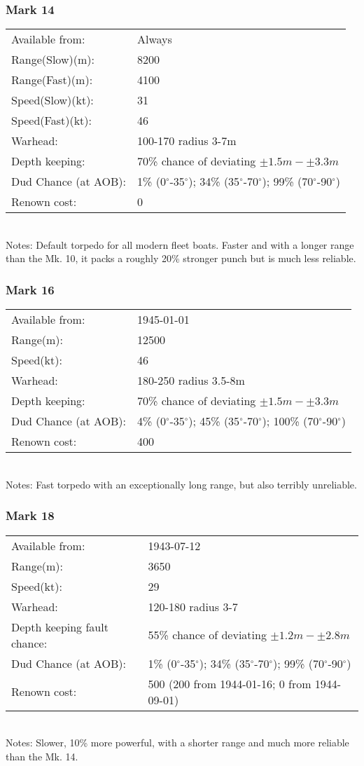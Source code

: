 \documentclass{article}
\newcommand{\degree}{$^{\circ}$}
\begin{document}
\subsubsection{Mark 14}
\begin{tabular}{l|l}
Available from:& Always\\
Range(Slow)(m):& 8200\\
Range(Fast)(m):& 4100\\
Speed(Slow)(kt):&31\\
Speed(Fast)(kt):& 46\\
Warhead:& 100-170 radius 3-7m\\
Depth keeping:& 70\% chance of deviating $\pm 1.5m - \pm 3.3m$\\
Dud Chance (at AOB):& 1\% (0\degree-35\degree); 34\% (35\degree-70\degree); 99\% (70\degree-90\degree)\\
Renown cost:& 0\\
\end{tabular} \\
Notes: Default torpedo for all modern fleet boats. Faster and with a longer range than the Mk. 10, it packs a roughly 20\% stronger punch but is much less reliable.

\subsubsection{Mark 16}
\begin{tabular}{l|l}
Available from:& 1945-01-01\\
Range(m):& 12500\\
Speed(kt):&46\\
Warhead:& 180-250 radius 3.5-8m\\
Depth keeping:&  70\% chance of deviating $\pm 1.5m - \pm 3.3m$\\
Dud Chance (at AOB):& 4\% (0\degree-35\degree); 45\% (35\degree-70\degree); 100\% (70\degree-90\degree)\\
Renown cost:& 400\\
\end{tabular} \\
Notes: Fast torpedo with an exceptionally long range, but also terribly unreliable.

\subsubsection{Mark 18}
\begin{tabular}{l|l}
Available from:& 1943-07-12\\
Range(m):& 3650\\
Speed(kt):&29\\
Warhead:& 120-180 radius 3-7\\
Depth keeping fault chance:& 55\% chance of deviating $\pm 1.2m - \pm 2.8m$\\
Dud Chance (at AOB):& 1\% (0\degree-35\degree); 34\% (35\degree-70\degree); 99\% (70\degree-90\degree)\\
Renown cost:&  500 (200 from 1944-01-16; 0 from 1944-09-01)\\
\end{tabular} \\
Notes: Slower, 10\% more powerful, with a shorter range and much more reliable than the Mk. 14.
\end{document}
